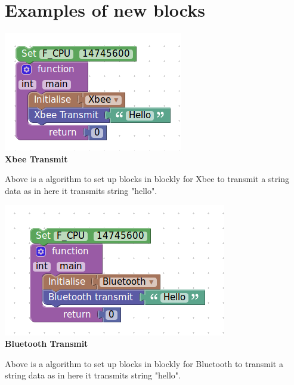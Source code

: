 \documentclass[a4paper,12pt,oneside]{book}
\begin{document}
\newpage\section{Examples of new blocks}    
    
\begin{center}
    \includegraphics[scale =0.6]{xbeetxsam}\\[.3in]
    \textbf{Xbee Transmit}\\[1.3in]
    \end{center}
    \vspace{-2cm}
    Above is a algorithm to set up blocks in blockly for Xbee to transmit a string
    data as in here it transmits string "hello".    
\begin{center}
    \includegraphics[scale =0.6]{blutxsam1}\\[.3in]
    \textbf{Bluetooth Transmit}\\[1.3in]
    \end{center}
    \vspace{-2cm}
    Above is a algorithm to set up blocks in blockly for Bluetooth to transmit a string data as in here it transmits string "hello".
    
\end{document}
